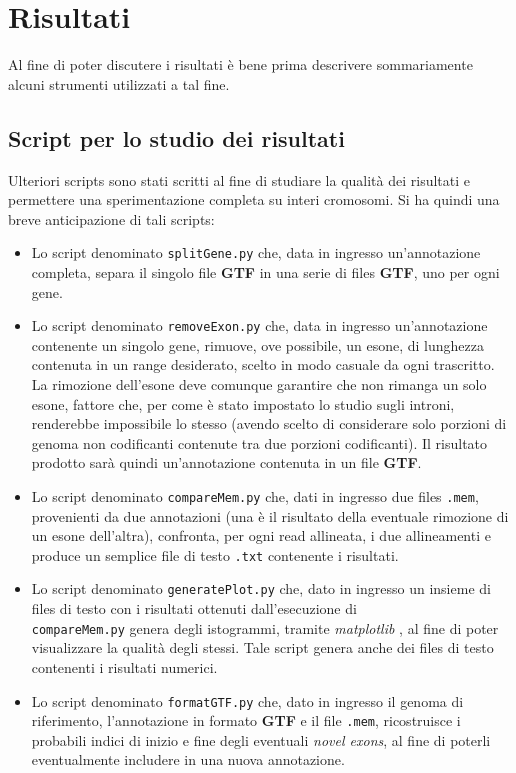 \documentclass[a4paper,12pt, oneside]{book}
\begin{document}
\chapter{Risultati}
Al fine di poter discutere i risultati è bene prima descrivere sommariamente
alcuni strumenti utilizzati a tal fine.
\section{Script per lo studio dei risultati}
Ulteriori scripts sono stati scritti al fine di studiare la qualità dei
risultati e permettere una sperimentazione completa su interi cromosomi. Si ha
quindi una breve anticipazione di tali scripts:
\begin{itemize}
  \item Lo script denominato \texttt{splitGene.py} che, data in ingresso
  un'annotazione completa, separa il singolo file \textbf{GTF} in una serie di
  files \textbf{GTF}, uno per ogni gene.
  \item Lo script denominato \texttt{removeExon.py} che, data in ingresso
  un'annotazione contenente 
  un singolo gene, rimuove, ove possibile, un esone, di lunghezza contenuta in un
  range desiderato, scelto in modo casuale da
  ogni trascritto. La rimozione dell'esone deve comunque garantire che non
  rimanga un solo esone, fattore che, per come è stato impostato lo studio sugli
  introni, renderebbe impossibile lo stesso (avendo scelto di considerare solo
  porzioni di genoma non codificanti contenute tra due porzioni codificanti). Il
  risultato prodotto sarà quindi un'annotazione contenuta in un file
  \textbf{GTF}.
  \item Lo script denominato \texttt{compareMem.py} che, dati in ingresso due
  files \texttt{.mem}, 
  provenienti da due annotazioni (una è il risultato della eventuale
  rimozione di un esone dell'altra), confronta, per ogni read allineata, i due
  allineamenti e produce un semplice file di testo \texttt{.txt} contenente i
  risultati.
  \item Lo script denominato \texttt{generatePlot.py} che, dato in ingresso un
  insieme di files di 
  testo con i risultati ottenuti dall'esecuzione di \\\texttt{compareMem.py}
  genera degli istogrammi, tramite \textit{matplotlib} \cite{matplotlib}, al
  fine di poter visualizzare la qualità degli stessi. Tale script genera anche
  dei files di testo contenenti i risultati numerici.
  \item Lo script denominato \texttt{formatGTF.py} che, dato in ingresso il
  genoma di riferimento, 
  l'annotazione in formato \textbf{GTF} e il file \texttt{.mem}, ricostruisce i
  probabili indici di inizio e fine degli eventuali \textit{novel exons}, al
  fine di poterli eventualmente includere in una nuova annotazione.
\end{itemize}
\end{document}
